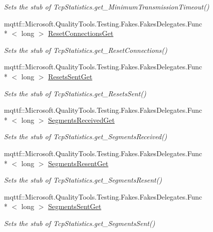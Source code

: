 \begin{DoxyCompactItemize}
\begin{DoxyCompactList}\small\item\em Sets the stub of Tcp\-Statistics.\-get\-\_\-\-Minimum\-Transmission\-Timeout()\end{DoxyCompactList}\item 
mqttf\-::\-Microsoft.\-Quality\-Tools.\-Testing.\-Fakes.\-Fakes\-Delegates.\-Func\\*
$<$ long $>$ \hyperlink{class_system_1_1_net_1_1_network_information_1_1_fakes_1_1_stub_tcp_statistics_ad61ea4633c14603e15a7d4e179ce51cf}{Reset\-Connections\-Get}
\begin{DoxyCompactList}\small\item\em Sets the stub of Tcp\-Statistics.\-get\-\_\-\-Reset\-Connections()\end{DoxyCompactList}\item 
mqttf\-::\-Microsoft.\-Quality\-Tools.\-Testing.\-Fakes.\-Fakes\-Delegates.\-Func\\*
$<$ long $>$ \hyperlink{class_system_1_1_net_1_1_network_information_1_1_fakes_1_1_stub_tcp_statistics_a9aa8442e959bf5c84a1bb37437f515ac}{Resets\-Sent\-Get}
\begin{DoxyCompactList}\small\item\em Sets the stub of Tcp\-Statistics.\-get\-\_\-\-Resets\-Sent()\end{DoxyCompactList}\item 
mqttf\-::\-Microsoft.\-Quality\-Tools.\-Testing.\-Fakes.\-Fakes\-Delegates.\-Func\\*
$<$ long $>$ \hyperlink{class_system_1_1_net_1_1_network_information_1_1_fakes_1_1_stub_tcp_statistics_a5a8baeab4bf48143550c04187aa2dd78}{Segments\-Received\-Get}
\begin{DoxyCompactList}\small\item\em Sets the stub of Tcp\-Statistics.\-get\-\_\-\-Segments\-Received()\end{DoxyCompactList}\item 
mqttf\-::\-Microsoft.\-Quality\-Tools.\-Testing.\-Fakes.\-Fakes\-Delegates.\-Func\\*
$<$ long $>$ \hyperlink{class_system_1_1_net_1_1_network_information_1_1_fakes_1_1_stub_tcp_statistics_a0fd252b6deb6119bf83ff6ade2bbd2cb}{Segments\-Resent\-Get}
\begin{DoxyCompactList}\small\item\em Sets the stub of Tcp\-Statistics.\-get\-\_\-\-Segments\-Resent()\end{DoxyCompactList}\item 
mqttf\-::\-Microsoft.\-Quality\-Tools.\-Testing.\-Fakes.\-Fakes\-Delegates.\-Func\\*
$<$ long $>$ \hyperlink{class_system_1_1_net_1_1_network_information_1_1_fakes_1_1_stub_tcp_statistics_af16e64ccd3c2fe8beb98909c3627f774}{Segments\-Sent\-Get}
\begin{DoxyCompactList}\small\item\em Sets the stub of Tcp\-Statistics.\-get\-\_\-\-Segments\-Sent()\end{DoxyCompactList}\end{DoxyCompactItemize}
